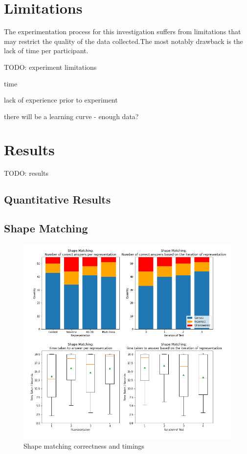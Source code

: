 \documentclass{l4proj}
\begin{document}
\section{Limitations}

The experimentation process for this investigation suffers from limitations that may restrict the quality of the data collected.The most notably drawback is the lack of time per participant.

TODO: experiment limitations

time

lack of experience prior to experiment

there will be a learning curve - enough data?

\section{Results}

TODO: results

\subsection{Quantitative Results}

\subsection*{Shape Matching}

\begin{figure}[H]
  \includegraphics[width=\textwidth]{images/results/shape_matching_stats.png}
  \caption{Shape matching correctness and timings}
  \label{fig:shape_stats}
\end{figure}
\end{document}
